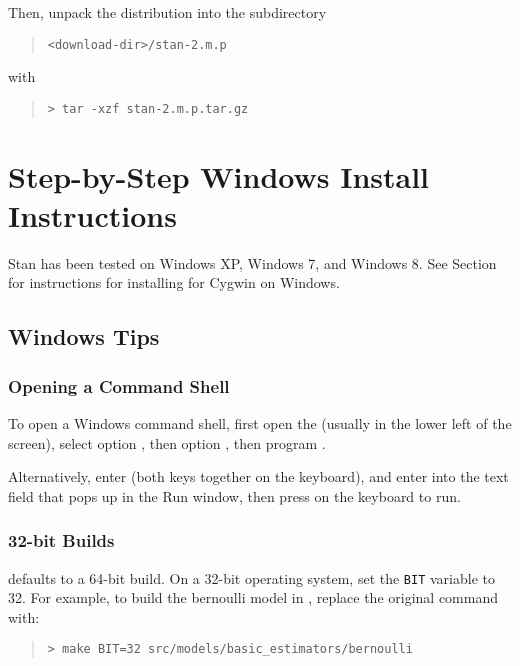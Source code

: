 Then, unpack the distribution into the subdirectory
\begin{quote}
\nolinkurl{<download-dir>/stan-2.m.p}
\end{quote}
%
with
%
\begin{quote}
\begin{Verbatim}[fontshape=sl,fontsize=\small]
> tar -xzf stan-2.m.p.tar.gz
\end{Verbatim}
\end{quote}



\section{Step-by-Step Windows Install Instructions}

Stan has been tested on Windows XP, Windows 7, and Windows 8.  See
Section~ for instructions for installing for Cygwin
on Windows.

\subsection{Windows Tips}

\subsubsection{Opening a Command Shell}

To open a Windows command shell, first open the 
(usually in the lower left of the screen), select option
, then option , then
program .

Alternatively, enter \code{[Windows+r]} (both keys together on the
keyboard), and enter  into the text field that pops up in
the Run window, then press \code{[Return]} on the keyboard to run.

\subsubsection{32-bit Builds}

\Stan defaults to a 64-bit build. On a 32-bit operating system, set
the \verb|BIT| variable to 32. For example, to build the bernoulli
model in , replace the original command
with:
%
\begin{quote}
\begin{Verbatim}[fontshape=sl]
> make BIT=32 src/models/basic_estimators/bernoulli
\end{Verbatim}
\end{quote}


